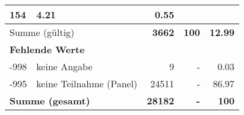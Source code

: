 \begin{longtable}{lXrrr}
       \num{154} &
       \num[round-mode=places,round-precision=2]{4,21} &
         \num[round-mode=places,round-precision=2]{0,55} \\
     \midrule
     \multicolumn{2}{l}{Summe (gültig)} &
       \textbf{\num{3662}} &
     \textbf{100} &
       \textbf{\num[round-mode=places,round-precision=2]{12,99}} \\
     \multicolumn{5}{l}{\textbf{Fehlende Werte}}\\
       -998 &
       keine Angabe &
         \num{9} &
        - &
         \num[round-mode=places,round-precision=2]{0,03} \\
       -995 &
       keine Teilnahme (Panel) &
         \num{24511} &
        - &
         \num[round-mode=places,round-precision=2]{86,97} \\
     \midrule
     \multicolumn{2}{l}{\textbf{Summe (gesamt)}} &
          \textbf{\num{28182}} &
        \textbf{-} &
        \textbf{100} \\
     \bottomrule
     \end{longtable}
     

